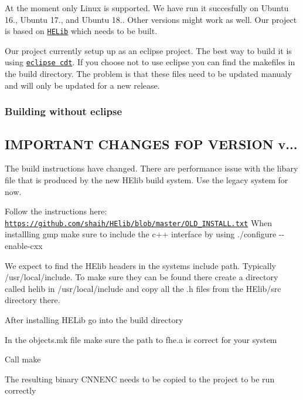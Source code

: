 At the moment only Linux is supported. We have run it succesfully on Ubuntu 16., Ubuntu 17., and Ubuntu 18.. Other versions might work as well. Our project is based on \href{https://github.com/shaih/HElib}{\tt H\+E\+Lib} which needs to be built.

Our project currently setup up as an eclipse project. The best way to build it is using \href{https://www.eclipse.org/cdt/}{\tt eclipse cdt}. If you choose not to use eclipse you can find the makefiles in the {\ttfamily build} directory. The problem is that these files need to be updated manualy and will only be updated for a new release.

\subsubsection*{Building without eclipse}

\subsection*{I\+M\+P\+O\+R\+T\+A\+NT C\+H\+A\+N\+G\+ES F\+OP V\+E\+R\+S\+I\+ON v...}

The build instructions have changed. There are performance issue with the libary file that is produced by the new H\+Elib build system. Use the legacy system for now.


\begin{DoxyEnumerate}
\item Follow the instructions here\+: \href{https://github.com/shaih/HElib/blob/master/OLD_INSTALL.txt}{\tt https\+://github.\+com/shaih/\+H\+Elib/blob/master/\+O\+L\+D\+\_\+\+I\+N\+S\+T\+A\+L\+L.\+txt} When installling {\ttfamily gmp} make sure to include the c++ interface by using {\ttfamily ./configure -\/-\/enable-\/cxx}
\item We expect to find the H\+Elib headers in the systems include path. Typically {\ttfamily /usr/local/include}. To make sure they can be found there create a directory called {\ttfamily helib} in {\ttfamily /usr/local/include} and copy all the {\ttfamily .h} files from the {\ttfamily H\+Elib/src} directory there.
\item After installing H\+E\+Lib go into the {\ttfamily build} directory
\item In the {\ttfamily objects.\+mk} file make sure the path to {\ttfamily fhe.\+a} is correct for your system
\item Call {\ttfamily make}
\item The resulting binary {\ttfamily C\+N\+N\+E\+NC} needs to be copied to the project to be run correctly
\end{DoxyEnumerate}

